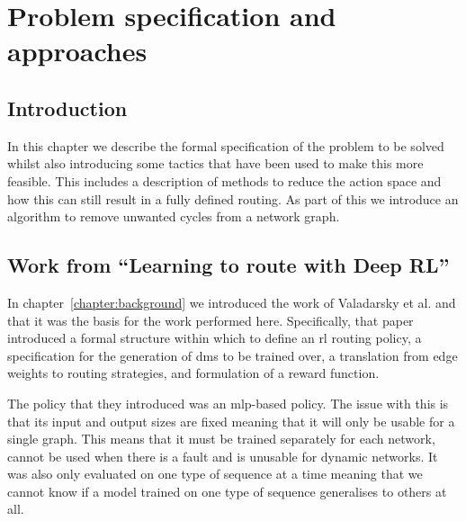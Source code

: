 \chapter{Problem specification and approaches}
\label{chapter:problem}

\section{Introduction}
In this chapter we describe the formal specification of the problem to be solved whilst also introducing some tactics that have been used to make this more feasible. This includes a description of methods to reduce the action space and how this can still result in a fully defined routing. As part of this we introduce an algorithm to remove unwanted cycles from a network graph.

\section{Work from ``Learning to route with Deep RL''}
In chapter~\ref{chapter:background} we introduced the work of Valadarsky et al.\cite{valadarsky2017learning} and that it was the basis for the work performed here. Specifically, that paper introduced a formal structure within which to define an \ac{rl} routing policy, a specification for the generation of \acp{dm} to be trained over, a translation from edge weights to routing strategies, and formulation of a reward function.

The policy that they introduced was an \ac{mlp}-based policy. The issue with this is that its input and output sizes are fixed meaning that it will only be usable for a single graph. This means that it must be trained separately for each network, cannot be used when there is a fault and is unusable for dynamic networks. It was also only evaluated on one type of sequence at a time meaning that we cannot know if a model trained on one type of sequence generalises to others at all.


